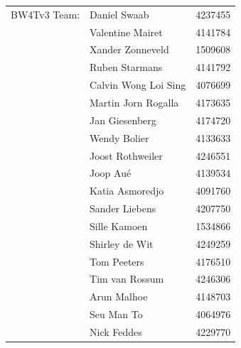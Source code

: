 \begin{titlepage}
\begin{center}
\begin{tabular}{lll}
    BW4Tv3 Team: & Daniel Swaab & 4237455\\
        & Valentine Mairet     & 4141784\\
        & Xander Zonneveld     & 1509608\\
        & Ruben Starmans       & 4141792\\
        & Calvin Wong Loi Sing & 4076699\\
        & Martin Jorn Rogalla  & 4173635\\
        & Jan Giesenberg       & 4174720\\
        & Wendy Bolier         & 4133633\\
        & Joost Rothweiler    & 4246551\\
        & Joop Aué             & 4139534\\
        & Katia Asmoredjo      & 4091760\\
        & Sander Liebens       & 4207750\\
        & Sille Kamoen         & 1534866\\
        & Shirley de Wit       & 4249259\\
        & Tom Peeters          & 4176510\\
        & Tim van Rossum       & 4246306\\
        & Arun Malhoe          & 4148703\\
        & Seu Man To           & 4064976\\
        & Nick Feddes          & 4229770
\end{tabular}

\bigskip
\bigskip

\bigskip
\bigskip

\end{center}

\end{titlepage}
